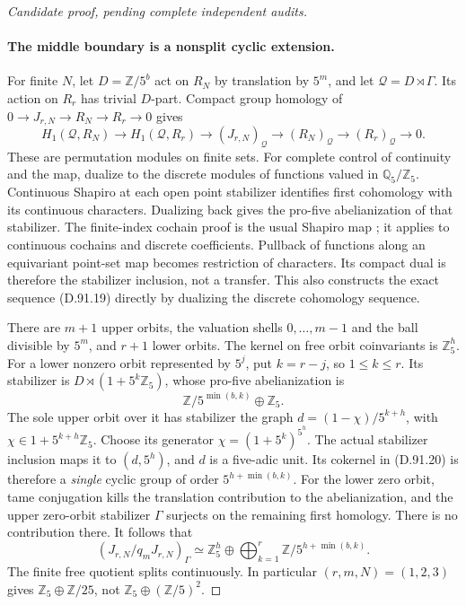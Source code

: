 \begin{proof}[Candidate proof, pending complete independent audits]
\paragraph{The middle boundary is a nonsplit cyclic extension.}
For finite \(N\), let \(D=\mathbb Z/5^b\) act on
\(R_N\) by translation by \(5^m\), and let
\(\mathcal Q=D\rtimes\Gamma\). Its action on \(R_r\)
has trivial \(D\)-part. Compact group homology of
\(0\to J_{r,N}\to R_N\to R_r\to0\) gives
\[
 H_1(\mathcal Q,R_N)\longrightarrow H_1(\mathcal Q,R_r)
 \longrightarrow (J_{r,N})_{\mathcal Q}
 \longrightarrow (R_N)_{\mathcal Q}\longrightarrow(R_r)_{\mathcal Q}
 \longrightarrow0.                                           \tag{D.91.19}
\]
These are permutation modules on finite sets. For complete
control of continuity and the map, dualize to the discrete
modules of functions valued in \(\mathbb Q_5/\mathbb Z_5\).
Continuous Shapiro at each open point stabilizer identifies
first cohomology with its continuous characters. Dualizing
back gives the pro-five abelianization of that stabilizer.
The finite-index cochain proof is the usual Shapiro map
\cite[II, Proposition 1.11 and Example 1.27(a)]{PBC_MilneCFT};
it applies to continuous cochains and discrete coefficients.
Pullback of functions along an equivariant point-set map
becomes restriction of characters. Its compact dual is
therefore the stabilizer inclusion, not a transfer. This
also constructs the exact sequence (D.91.19) directly by
dualizing the discrete cohomology sequence.

There are \(m+1\) upper orbits, the valuation shells
\(0,\ldots,m-1\) and the ball divisible by \(5^m\),
and \(r+1\) lower orbits. The kernel on free orbit
coinvariants is \(\mathbb Z_5^h\). For a lower nonzero
orbit represented by \(5^j\), put \(k=r-j\), so
\(1\le k\le r\). Its stabilizer is
\(D\rtimes(1+5^k\mathbb Z_5)\), whose pro-five
abelianization is
\[
             \mathbb Z/5^{\min(b,k)}\oplus\mathbb Z_5.
                                                               \tag{D.91.20}
\]
The sole upper orbit over it has stabilizer the graph
\(d=(1-\chi)/5^{k+h}\), with
\(\chi\in1+5^{k+h}\mathbb Z_5\). Choose its generator
\(\chi=(1+5^k)^{5^h}\). The actual stabilizer inclusion
maps it to \((d,5^h)\), and \(d\) is a five-adic unit.
Its cokernel in (D.91.20) is therefore a \emph{single}
cyclic group of order \(5^{h+\min(b,k)}\).
For the lower zero orbit, tame conjugation kills the
translation contribution to the abelianization, and the
upper zero-orbit stabilizer \(\Gamma\) surjects on the
remaining first homology. There is no contribution there.
It follows that
\[
 (J_{r,N}/q_mJ_{r,N})_\Gamma
       \simeq\mathbb Z_5^h\oplus
                       \bigoplus_{k=1}^r\mathbb Z/5^{h+\min(b,k)}.
                                                               \tag{D.91.21}
\]
The finite free quotient splits continuously. In particular
\((r,m,N)=(1,2,3)\) gives \(\mathbb Z_5\oplus\mathbb Z/25\),
not \(\mathbb Z_5\oplus(\mathbb Z/5)^2\).


\end{proof}
